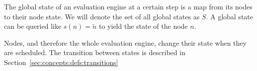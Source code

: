 The global state of an evaluation engine at a certain step is a map from its nodes to their node state.
We will denote the set of all global states as \(S\).
A global state can be queried like \(s(n) = \widetilde{n}\) to yield the state of the node \(n\).

Nodes, and therefore the whole evaluation engine, change their state when they are scheduled.
The transition between states is described in Section~\ref{sec:concepts:defs:transitions}



